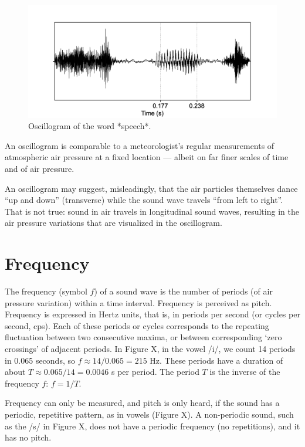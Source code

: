 \documentclass[
]{book}
\begin{document}
\begin{figure}

{\centering \includegraphics{figures/speech_word_oscillogram} 

}

\caption{Oscillogram of the word *speech*.}\label{fig:speech-oscillogram}
\end{figure}

An oscillogram is comparable to a meteorologist's regular measurements of atmospheric air pressure at a fixed location --- albeit on far finer scales of time and of air pressure.

An oscillogram may suggest, misleadingly, that the air particles themselves dance ``up and down'' (transverse) while the sound wave travels ``from left to right''. That is not true: sound in air travels in longitudinal sound waves, resulting in the air pressure variations that are visualized in the oscillogram.

\section{Frequency}\label{frequency}

The frequency (symbol \(f\)) of a sound wave is the number of periods (of air pressure variation) within a time interval. Frequency is perceived as pitch. Frequency is expressed in Hertz units, that is, in periods per second (or cycles per second, cps). Each of these periods or cycles corresponds to the repeating fluctuation between two consecutive maxima, or between corresponding `zero crossings' of adjacent periods. In Figure X, in the vowel /i/, we count 14 periods in 0.065 seconds, so \(f\approx 14/0.065 = 215\) Hz. These periods have a duration of about \(T \approx 0.065/14 = 0.0046\) s per period. The period \(T\) is the inverse of the frequency \(f\): \(f = 1/T\).

Frequency can only be measured, and pitch is only heard, if the sound has a periodic, repetitive pattern, as in vowels (Figure X). A non-periodic sound, such as the /s/ in Figure X, does not have a periodic frequency (no repetitions), and it has no pitch.
\end{document}
